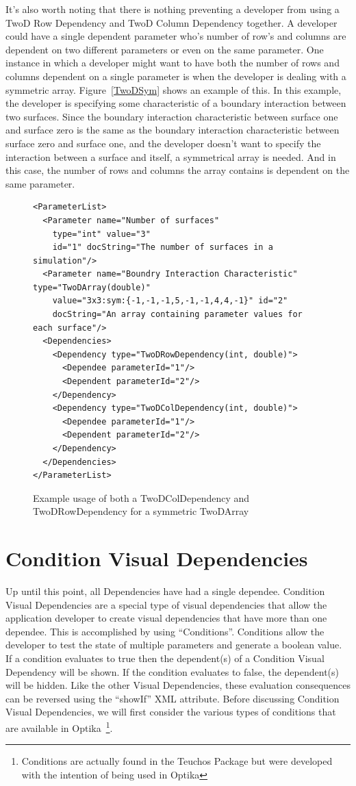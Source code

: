It's also worth noting that there is nothing preventing a developer from using a TwoD Row Dependency and TwoD Column Dependency together. 
A developer could have a single
dependent parameter who's number of row's and columns are dependent on two different parameters or even on the same parameter. One instance in which a
developer
might want to have both the number of rows and columns dependent on a single parameter is when the developer is dealing with a symmetric array. 
Figure~\ref{TwoDSym}
shows an example of this. In this example, the developer is specifying some characteristic of a boundary interaction between two surfaces. Since the boundary
interaction characteristic between surface one and surface zero is the same as the boundary interaction characteristic between surface zero and surface one,
and the developer doesn't want to specify the interaction between a surface and itself, a symmetrical array is needed. And in this case, the number of rows 
and columns the array contains is dependent on the same parameter.

\begin{figure}
\centering
{\footnotesize
\begin{Verbatim}
<ParameterList>
  <Parameter name="Number of surfaces" 
    type="int" value="3"
    id="1" docString="The number of surfaces in a simulation"/>
  <Parameter name="Boundry Interaction Characteristic" type="TwoDArray(double)"
    value="3x3:sym:{-1,-1,-1,5,-1,-1,4,4,-1}" id="2" 
    docString="An array containing parameter values for each surface"/>
  <Dependencies>
    <Dependency type="TwoDRowDependency(int, double)">
      <Dependee parameterId="1"/>
      <Dependent parameterId="2"/>
    </Dependency>
    <Dependency type="TwoDColDependency(int, double)">
      <Dependee parameterId="1"/>
      <Dependent parameterId="2"/>
    </Dependency>
  </Dependencies>
</ParameterList>
\end{Verbatim}
}
\caption{Example usage of both a TwoDColDependency and TwoDRowDependency for a symmetric TwoDArray}
\label{TwoDColXML}
\end{figure}

\section{Condition Visual Dependencies}
Up until this point, all Dependencies have had a single dependee. Condition Visual Dependencies are a special type of visual dependencies that allow the application developer to
create visual dependencies that have more than one dependee. This is accomplished by using ``Conditions''. Conditions allow the developer to test the state of multiple 
parameters and generate a boolean value. If a condition evaluates to true then the dependent(s) of a Condition Visual Dependency will be shown. If the condition evaluates to 
false, the dependent(s) will be hidden. Like the other Visual Dependencies, these evaluation consequences can be reversed using the ``showIf'' XML attribute.  Before discussing 
Condition Visual Dependencies, we will first consider the various types of conditions that are available in Optika~\footnote{Conditions are actually found in the Teuchos Package 
but were developed with the intention of being used in Optika}.

